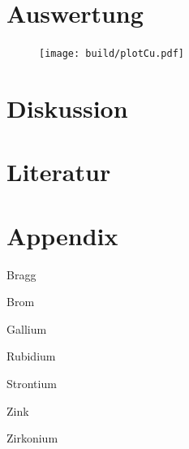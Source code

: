 \section{Auswertung}

\flushleft{\;}\justifying

    \begin{figure}[H]
        \centering
        \texttt{[image: build/plotCu.pdf]}
        \label{fig:}
    \end{figure}

\section{Diskussion}

\newpage
\section{Literatur}

\newpage
\section{Appendix}

    

    \begin{table}[H]
        \centering
        \caption{Bragg}
        
        \label{tab:2}
    \end{table}

    \begin{table}[H]
        \centering
        \caption{Brom}
        
        \label{tab:3}
    \end{table}
    
    \begin{table}[H]
        \centering
        \caption{Gallium}
        
        \label{tab:4}
    \end{table}
    
    \begin{table}[H]
    \centering
        \begin{subtable}{.49\textwidth}
        \centering
        \caption{Rubidium}
        
        \label{tab:5a}
        \end{subtable}    
        \begin{subtable}{.49\textwidth}
        \centering
        \caption{Strontium}
        
        \label{tab:5b}
        \end{subtable}
        \begin{subtable}{.49\textwidth}
        \centering
        \caption{Zink}
        
        \label{tab:5c}
        \end{subtable}    
        \begin{subtable}{.49\textwidth}
        \centering
        \caption{Zirkonium}
        
        \label{tab:5d}
        \end{subtable}
    \end{table}

